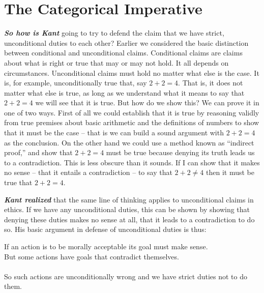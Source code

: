 \documentclass[
  12pt, openany]{book}
\theoremstyle{definition}
\theoremstyle{definition}
\theoremstyle{definition}
\theoremstyle{definition}
\theoremstyle{remark}
\begin{document}
\hypertarget{the-categorical-imperative}{%
\section{The Categorical Imperative}\label{the-categorical-imperative}}

\textbf{\emph{So how is Kant}} going to try to defend the claim that we have strict, unconditional duties to each other? Earlier we considered the basic distinction between conditional and unconditional claims. Conditional claims are claims about what is right or true that may or may not hold. It all depends on circumstances. Unconditional claims must hold no matter what else is the case. It is, for example, unconditionally true that, say \(2 + 2 = 4\). That is, it does not matter what else is true, as long as we understand what it means to say that \(2 + 2 = 4\) we will see that it is true. But how do we show this? We can prove it in one of two ways. First of all we could establish that it is true by reasoning validly from true premises about basic arithmetic and the definitions of numbers to show that it must be the case -- that is we can build a sound argument with \(2 + 2 = 4\) as the conclusion. On the other hand we could use a method known as ``indirect proof,'' and show that \(2 + 2 = 4\) must be true because denying its truth leads us to a contradiction. This is less obscure than it sounds. If I can show that it makes no sense -- that it entails a contradiction -- to say that \(2 +2 \neq 4\) then it must be true that \(2 + 2 = 4\).

\textbf{\emph{Kant realized}} that the same line of thinking applies to unconditional claims in ethics. If we have any unconditional duties, this can be shown by showing that denying these duties makes no sense at all, that it leads to a contradiction to do so. His basic argument in defense of unconditional duties is thus:

\begin{center}

\begin{argument}
If an action is to be morally acceptable its goal must make sense.\\
But some actions have goals that contradict themselves.\\
~\\
So such actions are unconditionally wrong and we have strict duties not to do them.

\end{argument}


\end{center}
\end{document}
